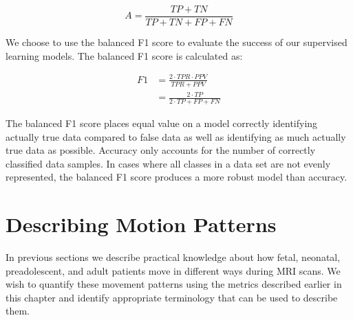 \begin{equation}
A = \frac{TP+TN}{TP+TN+FP+FN}
\end{equation}

We choose to use the balanced F1 score to evaluate the success of our supervised learning models. The balanced F1 score is calculated as:

\begin{equation}
\begin{split}
F1 & = \frac{2 \cdot TPR \cdot PPV}{TPR+PPV} \\
& = \frac{2 \cdot TP}{2 \cdot TP + FP + FN}
\end{split}
\end{equation}

The balanced F1 score places equal value on a model correctly identifying actually true data compared to false data as well as identifying as much actually true data as possible. Accuracy only accounts for the number of correctly classified data samples. In cases where all classes in a data set are not evenly represented, the balanced F1 score produces a more robust model than accuracy. 

\section{Describing Motion Patterns}

In previous sections we describe practical knowledge about how fetal, neonatal, preadolescent, and adult patients move in different ways during MRI scans. We wish to quantify these movement patterns using the metrics described earlier in this chapter and identify appropriate terminology that can be used to describe them.





